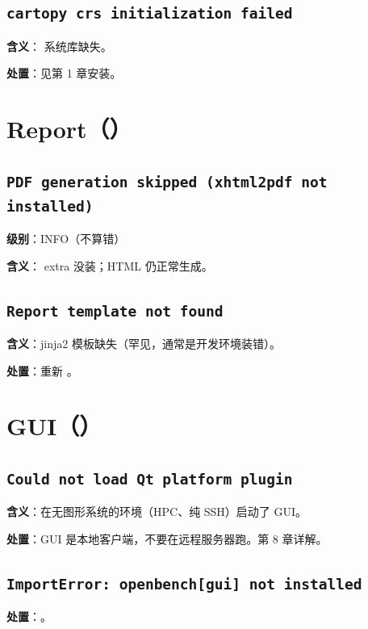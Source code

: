 \subsection{\texttt{cartopy crs initialization failed}}

\textbf{含义}： 系统库缺失。

\textbf{处置}：见第 1 章安装。

\section{Report（）}

\subsection{\texttt{PDF generation skipped (xhtml2pdf not installed)}}

\textbf{级别}：INFO（不算错）

\textbf{含义}：\cli{[report]} extra 没装；HTML 仍正常生成。

\subsection{\texttt{Report template not found}}

\textbf{含义}：jinja2 模板缺失（罕见，通常是开发环境装错）。

\textbf{处置}：重新 。

\section{GUI（）}

\subsection{\texttt{Could not load Qt platform plugin}}

\textbf{含义}：在无图形系统的环境（HPC、纯 SSH）启动了 GUI。

\textbf{处置}：GUI 是本地客户端，不要在远程服务器跑。第 8 章详解。

\subsection{\texttt{ImportError: openbench[gui] not installed}}

\textbf{处置}：。

